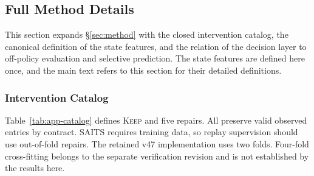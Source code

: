 \documentclass{article}
\begin{document}
\subsection{Full Method Details}
\label{app:method-details}
This section expands \S\ref{sec:method} with the closed intervention catalog, the canonical
definition of the state features, and the relation of the decision layer to off-policy
evaluation and selective prediction. The state features are defined here once, and the main
text refers to this section for their detailed definitions.

\subsubsection{Intervention Catalog}
\label{app:catalog}
Table~\ref{tab:app-catalog} defines \textsc{Keep} and five repairs. All preserve valid observed
entries by contract. SAITS requires training data, so replay supervision should use
out-of-fold repairs. The retained v47 implementation uses two folds. Four-fold cross-fitting
belongs to the separate verification revision and is not established by the results here.

\begin{table}[htbp]
  \caption{The six admissible interventions. Observed entries are the entries that are
  present and valid in the reference input $X^{a_0}$, and an action that modified them would
  violate the integrity constraint of \S\ref{sec:method-problem}.}
  \label{tab:app-catalog}
  \centering
  \small
  \setlength{\tabcolsep}{4pt}
\end{table}
\end{document}
